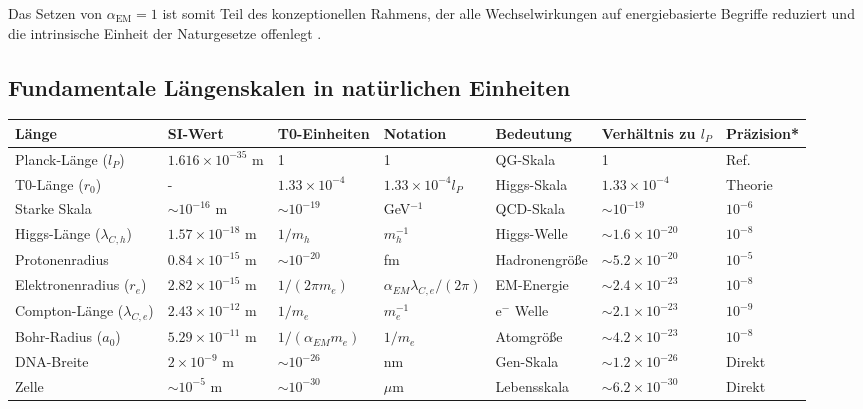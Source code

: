 \documentclass[12pt,a4paper]{article}
\newcommand{\alphaEM}{\alpha_{\text{EM}}}
\begin{document}
	Das Setzen von $\alphaEM = 1$ ist somit Teil des konzeptionellen Rahmens, der alle Wechselwirkungen auf energiebasierte Begriffe reduziert und die intrinsische Einheit der Naturgesetze offenlegt \cite{pascher_alphabeta_2025}.
	
	\subsection{Fundamentale Längenskalen in natürlichen Einheiten}
	
	\begin{table}[ht]
		\centering
		\begin{adjustbox}{scale=0.7}
			\begin{tabular}{lllllll}
				\hline
				\textbf{Länge} & \textbf{SI-Wert} & \textbf{T0-Einheiten} & \textbf{Notation} & \textbf{Bedeutung} & \textbf{Verhältnis zu $l_P$} & \textbf{Präzision*} \\
				\hline
				Planck-Länge ($l_P$) & $1.616 \times 10^{-35}$ m & 1 & 1 & QG-Skala & 1 & Ref. \\
				T0-Länge ($r_0$) & - & $1.33 \times 10^{-4}$ & $1.33 \times 10^{-4} l_P$ & Higgs-Skala & $1.33 \times 10^{-4}$ & Theorie \\
				Starke Skala & $\sim 10^{-16}$ m & $\sim 10^{-19}$ & GeV$^{-1}$ & QCD-Skala & $\sim 10^{-19}$ & $10^{-6}$ \\
				Higgs-Länge ($\lambda_{C,h}$) & $1.57 \times 10^{-18}$ m & $1/m_h$ & $m_h^{-1}$ & Higgs-Welle & $\sim 1.6 \times 10^{-20}$ & $10^{-8}$ \\
				Protonenradius & $0.84 \times 10^{-15}$ m & $\sim 10^{-20}$ & fm & Hadronengröße & $\sim 5.2 \times 10^{-20}$ & $10^{-5}$ \\
				Elektronenradius ($r_e$) & $2.82 \times 10^{-15}$ m & $1/(2\pi m_e)$ & $\alpha_{EM} \lambda_{C,e}/(2\pi)$ & EM-Energie & $\sim 2.4 \times 10^{-23}$ & $10^{-8}$ \\
				Compton-Länge ($\lambda_{C,e}$) & $2.43 \times 10^{-12}$ m & $1/m_e$ & $m_e^{-1}$ & e$^-$ Welle & $\sim 2.1 \times 10^{-23}$ & $10^{-9}$ \\
				Bohr-Radius ($a_0$) & $5.29 \times 10^{-11}$ m & $1/(\alpha_{EM} m_e)$ & $1/m_e$ & Atomgröße & $\sim 4.2 \times 10^{-23}$ & $10^{-8}$ \\
				DNA-Breite & $2 \times 10^{-9}$ m & $\sim 10^{-26}$ & nm & Gen-Skala & $\sim 1.2 \times 10^{-26}$ & Direkt \\
				Zelle & $\sim 10^{-5}$ m & $\sim 10^{-30}$ & $\mu$m & Lebensskala & $\sim 6.2 \times 10^{-30}$ & Direkt \\

\end{tabular}
\end{adjustbox}
\end{table}
\end{document}
